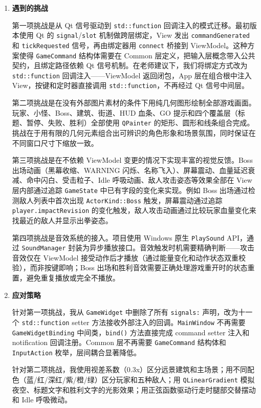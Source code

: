 \documentclass[a4paper]{article}
\begin{document}
\begin{enumerate}
  \item \textbf{遇到的挑战}

    第一项挑战是从 Qt 信号驱动到 \texttt{std::function} 回调注入的模式迁移。最初版本使用 Qt 的 \texttt{signal}/\texttt{slot} 机制做跨层绑定，View 发出 \texttt{commandGenerated} 和 \texttt{tickRequested} 信号，再由绑定器用 \texttt{connect} 桥接到 ViewModel。这种方案使得 \texttt{GameCommand} 结构体需要在 Common 层定义，把输入层概念带入公共契约，且绑定路径依赖 Qt 信号机制。在老师建议下，我们将绑定方式改为 \texttt{std::function} 回调注入——ViewModel 返回闭包，App 层在组合根中注入 View，按键和定时器直接调用 \texttt{std::function}，不再经过 Qt 信号中间层。

    第二项挑战是在没有外部图片素材的条件下用纯几何图形绘制全部游戏画面。玩家、小怪、Boss、建筑、街道、HUD 血条、GO 提示和四个覆盖层（标题、暂停、失败、胜利）全部使用 \texttt{QPainter} 的矩形、圆形和线条组合完成。挑战在于用有限的几何元素组合出可辨识的角色形象和场景氛围，同时保证在不同窗口尺寸下缩放一致。

    第三项挑战是在不依赖 ViewModel 变更的情况下实现丰富的视觉反馈。Boss 出场动画（黑幕收缩、WARNING 闪烁、名称飞入）、屏幕震动、血量延迟衰减、命中闪白、受击粒子、Idle 呼吸动画、敌人攻击姿态等效果全部在 View 层内部通过追踪 \texttt{GameState} 中已有字段的变化来实现。例如 Boss 出场通过检测敌人列表中首次出现 \texttt{ActorKind::Boss} 触发，屏幕震动通过追踪 \texttt{player.impactRevision} 的变化触发，敌人攻击动画通过比较玩家血量变化来找最近的敌人并显示出拳姿态。

    第四项挑战是音效系统的接入。项目使用 Windows 原生 \texttt{PlaySound} API，通过 \texttt{SoundManager} 封装为异步播放接口。音效触发时机需要精确判断——攻击音效仅在 ViewModel 接受动作后才播放（通过能量变化和动作状态双重校验），而非按键即响；Boss 出场和胜利音效需要正确处理游戏重开时的状态重置，避免重复播放或完全不播放。

  \item \textbf{应对策略}

    针对第一项挑战，我从 \texttt{GameWidget} 中删除了所有 \texttt{signals:} 声明，改为十一个 \texttt{std::function} setter 方法接收外部注入的回调。\texttt{MainWindow} 不再需要 \texttt{GameWidgetBinding} 中间类，\texttt{bind()} 方法直接完成 command setter 注入和 notification 回调注册。Common 层不再需要 \texttt{GameCommand} 结构体和 \texttt{InputAction} 枚举，层间耦合显著降低。

    针对第二项挑战，我使用视差系数（0.3x）区分远景建筑和主场景；用不同配色（蓝/红/深红/紫/橙/绿）区分玩家和五种敌人；用 \texttt{QLinearGradient} 模拟夜空、标题文字和胜利文字的光影效果；用正弦函数驱动行走时腿部交替摆动和 Idle 呼吸微动。


\end{enumerate}
\end{document}
